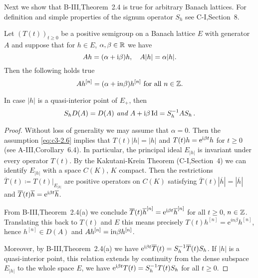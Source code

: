 Next we show that B-III,Theorem~2.4 is true for arbitrary Banach lattices.
For definition and simple properties of the signum operator $S_{h}$ see C-I,Section~8.

\begin{theorem}\label{thm:c3-2.2}
	Let $(T(t))_{t\geq 0}$ be a positive semigroup on a Banach lattice $E$ with generator $A$ and suppose that for $h \in E$, $\alpha,\beta \in \mathbb{R} $ we have
	\begin{equation}\label{eq:c3-2.6}
		Ah = (\alpha+\mathrm{i}\beta )h, \quad A|h| = \alpha|h|.
	\end{equation}
%
Then the following holds true
\begin{equation}\label{eq:c3-2.7}
	Ah^{[n]} = (\alpha+\mathrm{i} n\beta)h^{[n]} \text{ for all } n \in \mathbb{Z}.
\end{equation}

In case $|h|$ is a quasi-interior point of $E_{+}$, then 
\[
S_{h}D(A) = D(A) \textit{ and } A + \mathrm{i}\beta \operatorname{Id} = S_{h}^{-1}AS_{h}\,.
\]
\end{theorem}
\begin{proof}
	Without loss of generality we may assume that $\alpha = 0$.
	Then the assumption \eqref{eq:c3-2.6} implies that $T(t)|h| = |h|$ and $T(t)h = \mathrm{e}^{\mathrm{i}\beta t}h$ for $t \geq 0$ (see A-III,Corollary~6.4).
	In particular, the principal ideal $E_{|h|}$ is invariant under every operator $T(t)$.
	By the Kakutani-Krein Theorem (C-I,Section~4) we can identify $E_{|h|}$ with a space $C(K)$, $K$ compact.
	Then the restrictions $\overline{T}(t) \coloneq T(t)|_{E_{|h|}}$ are positive operators on $C(K)$ satisfying $\overline{T}(t)|\overline{h}| = |\overline{h}|$ and $\overline{T}(t)\overline{h} = \mathrm{e}^{\mathrm{i}\beta  t}\overline{h}$.
	
	From B-III,Theorem~2.4(a) we conclude $\overline{T}(t)\overline{h}^{[n]} = \mathrm{e}^{\mathrm{i}\beta  t}\overline{h}^{[n]}$ for all $t \geq 0$, $n \in \mathbb{Z}$.
	Translating this back to $T(t)$ and $E$ this means precisely $T(t)h^{[n]} = \mathrm{e}^{in\beta}h^{[n]}$, hence $h^{[n]} \in D(A)$ and $Ah^{[n]} = \mathrm{i}  n\beta h^{[n]}$.
	
	Moreover, by B-III,Theorem~2.4(a) we have $\mathrm{e}^{\mathrm{i}\beta  t}\overline{T}(t) = S_{h}^{-1}\overline{T}(t)S_{h}$.
	If $|h|$ is a quasi-interior point, this relation extends by continuity from the dense subspace $E_{|h|}$ to the whole space $E$, \ie  we have $\mathrm{e}^{\mathrm{i}\beta  t}T(t) = S_{h}^{-1}T(t)S_{h}$ for all $t \geq 0$.
\end{proof}

